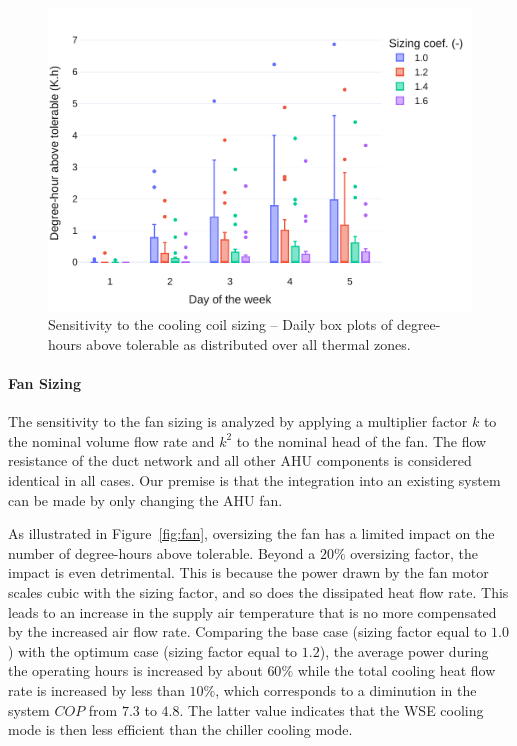\begin{figure}[!htbp]
\centering
\includegraphics[width=.7\linewidth]{../python_scripts/figures/CoilSizing.pdf}
\caption{Sensitivity to the cooling coil sizing -- Daily box plots of degree-hours above tolerable as distributed over all thermal zones.}
\label{fig:coil}
\end{figure}

\paragraph{Fan Sizing} \label{par:fan}

The sensitivity to the fan sizing is analyzed by applying a multiplier factor $k$ to the nominal volume flow rate and $k^2$ to the nominal head of the fan. The flow resistance of the duct network and all other AHU components is  considered  identical  in  all  cases.
Our premise is that the integration into an existing system can be made by only changing the AHU fan.

As illustrated in Figure~\ref{fig:fan}, oversizing the fan has a limited impact on the number of degree-hours above tolerable. Beyond a $20\%$ oversizing factor, the impact is even detrimental. This is because the power drawn by the fan motor scales cubic with the sizing factor, and so does the dissipated heat flow rate. This leads to an increase in the supply air temperature that is no more compensated by the increased air flow rate.
Comparing the base case (sizing factor equal to $1.0$) with the optimum case (sizing factor equal to $1.2$), the average power during the operating hours is increased by about $60\%$ while the total cooling heat flow rate is increased by less than $10\%$, which corresponds to a diminution in the system $COP$ from $7.3$ to $4.8$. The latter value indicates that the WSE cooling mode is then less efficient than the chiller cooling mode.


